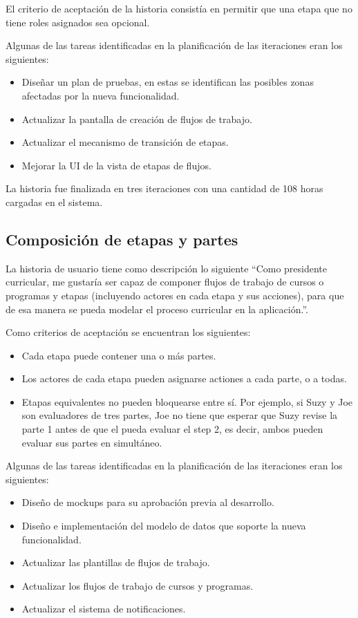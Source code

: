 El criterio de aceptación de la historia consistía en permitir que una etapa que no tiene roles asignados sea opcional.

Algunas de las tareas identificadas en la planificación de las iteraciones eran los siguientes:
\begin{itemize}
	\item Diseñar un plan de pruebas, en estas se identifican las posibles zonas afectadas por la nueva funcionalidad.
	\item Actualizar la pantalla de creación de flujos de trabajo.
	\item Actualizar el mecanismo de transición de etapas.
	\item Mejorar la UI de la vista de etapas de flujos.
\end{itemize}

La historia fue finalizada en tres iteraciones con una cantidad de 108 horas cargadas en el sistema.

\subsection{Composición de etapas y partes}
La historia de usuario tiene como descripción lo siguiente \enquote{Como presidente curricular, me gustaría ser capaz de componer flujos de trabajo de cursos o programas y etapas (incluyendo actores en cada etapa y sus acciones), para que de esa manera se pueda modelar el proceso curricular en la aplicación.}.

Como criterios de aceptación se encuentran los siguientes:
\begin{itemize}
	\item Cada etapa puede contener una o más partes.
	\item Los actores de cada etapa pueden asignarse actiones a cada parte, o a todas.
	\item Etapas equivalentes no pueden bloquearse entre sí. Por ejemplo, si Suzy y Joe son evaluadores de tres partes, Joe no tiene que esperar que Suzy revise la parte 1 antes de que el pueda evaluar el step 2, es decir, ambos pueden evaluar sus partes en simultáneo.
\end{itemize}

Algunas de las tareas identificadas en la planificación de las iteraciones eran los siguientes:
\begin{itemize}
	\item Diseño de mockups para su aprobación previa al desarrollo.
	\item Diseño e implementación del modelo de datos que soporte la nueva funcionalidad.
	\item Actualizar las plantillas de flujos de trabajo.
	\item Actualizar los flujos de trabajo de cursos y programas.
	\item Actualizar el sistema de notificaciones.
\end{itemize}

